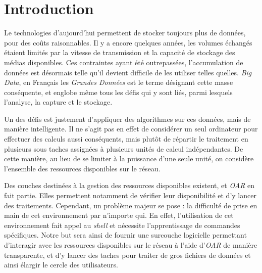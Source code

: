 \section{Introduction}

\par Le technologies d'aujourd'hui permettent de stocker toujours plus de données, pour des coûts raisonnables. Il y a encore quelques années, les volumes échangés étaient limités par la vitesse de transmission et la capacité de stockage des médias disponibles. Ces contraintes ayant été outrepassées, l'accumulation de données est désormais telle qu'il devient difficile de les utiliser telles quelles. \emph{Big Data}, en Fran\c cais les \emph{Grandes Données} est le terme désignant cette masse conséquente, et englobe même tous les défis qui y sont liés, parmi lesquels l'analyse, la capture et le stockage.
\par Un des défis est justement d'appliquer des algorithmes sur ces données, mais de manière intelligente. Il ne s'agit pas en effet de considérer un seul ordinateur pour effectuer des calculs aussi conséquents, mais plutôt de répartir le traitement en plusieurs sous taches assignées à plusieurs unités de calcul indépendantes. De cette manière, au lieu de se limiter à la puissance d'une seule unité, on considère l'ensemble des ressources disponibles sur le réseau.
\par Des couches destinées à la gestion des ressources disponibles existent, et \emph{OAR} en fait partie. Elles permettent notamment de vérifier leur disponibilité et d'y lancer des traitements. Cependant, un problème majeur se pose : la difficulté de prise en main de cet environnement par n'importe qui. En effet, l'utilisation de cet environnement fait appel au \emph{shell} et nécessite l'apprentissage de commandes spécifiques. Notre but sera ainsi de fournir une surcouche logicielle permettant d'interagir avec les ressources disponibles sur le réseau à l'aide d'\emph{OAR} de manière transparente, et d'y lancer des taches pour traiter de gros fichiers de données et ainsi élargir le cercle des utilisateurs.

